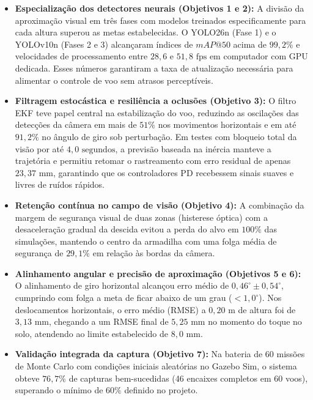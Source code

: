 \begin{itemize}
	\item \textbf{Especialização dos detectores neurais (Objetivos 1 e 2):} A divisão da aproximação visual em três fases com modelos treinados especificamente para cada altura superou as metas estabelecidas. O YOLO26n (Fase 1) e o YOLOv10n (Fases 2 e 3) alcançaram índices de $mAP@50$ acima de $99{,}2\%$ e velocidades de processamento entre $28{,}6$ e $51{,}8\text{ fps}$ em computador com GPU dedicada. Esses números garantiram a taxa de atualização necessária para alimentar o controle de voo sem atrasos perceptíveis.
	
	\item \textbf{Filtragem estocástica e resiliência a oclusões (Objetivo 3):} O filtro EKF teve papel central na estabilização do voo, reduzindo as oscilações das detecções da câmera em mais de $51\%$ nos movimentos horizontais e em até $91{,}2\%$ no ângulo de giro sob perturbação. Em testes com bloqueio total da visão por até $4{,}0\text{ segundos}$, a previsão baseada na inércia manteve a trajetória e permitiu retomar o rastreamento com erro residual de apenas $23{,}37\text{ mm}$, garantindo que os controladores PD recebessem sinais suaves e livres de ruídos rápidos.
	
	\item \textbf{Retenção contínua no campo de visão (Objetivo 4):} A combinação da margem de segurança visual de duas zonas (histerese óptica) com a desaceleração gradual da descida evitou a perda do alvo em $100\%$ das simulações, mantendo o centro da armadilha com uma folga média de segurança de $29{,}1\%$ em relação às bordas da câmera.
	
	\item \textbf{Alinhamento angular e precisão de aproximação (Objetivos 5 e 6):} O alinhamento de giro horizontal alcançou erro médio de $0{,}46^\circ \pm 0{,}54^\circ$, cumprindo com folga a meta de ficar abaixo de um grau ($< 1{,}0^\circ$). Nos deslocamentos horizontais, o erro médio (RMSE) a $0{,}20\text{ m}$ de altura foi de $3{,}13\text{ mm}$, chegando a um RMSE final de $5{,}25\text{ mm}$ no momento do toque no solo, atendendo ao limite estabelecido de $8{,}0\text{ mm}$.
	
	\item \textbf{Validação integrada da captura (Objetivo 7):} Na bateria de 60 missões de Monte Carlo com condições iniciais aleatórias no Gazebo Sim, o sistema obteve $76{,}7\%$ de capturas bem-sucedidas (46 encaixes completos em 60 voos), superando o mínimo de $60\%$ definido no projeto.
\end{itemize}

